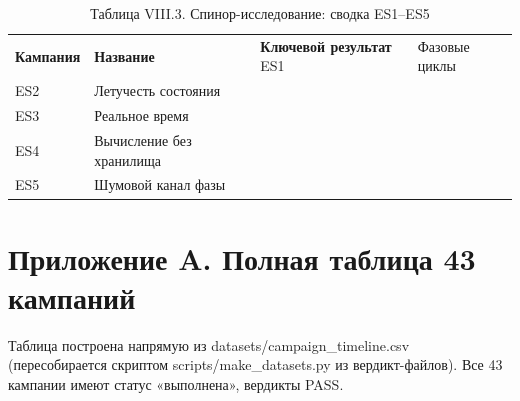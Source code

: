 \documentclass[11pt,a4paper]{article}
\begin{document}
\begin{table}[htbp]\centering\small
\caption{Таблица VIII.3. Спинор-исследование: сводка ES1–ES5}
\begin{tabular}{p{} p{} p{}}
\toprule
\textbf{Кампания} & \textbf{Название} & \textbf{Ключевой результат}
\midrule
ES1 & Фазовые циклы &  \\
ES2 & Летучесть состояния &  \\
ES3 & Реальное время &  \\
ES4 & Вычисление без хранилища &  \\
ES5 & Шумовой канал фазы &  \\
\bottomrule
\end{tabular}
\end{table}

\section{Приложение A. Полная таблица 43 кампаний}

Таблица построена напрямую из datasets/campaign\_timeline.csv (пересобирается скриптом scripts/make\_datasets.py из вердикт-файлов). Все 43 кампании имеют статус «выполнена», вердикты PASS.
\end{document}
